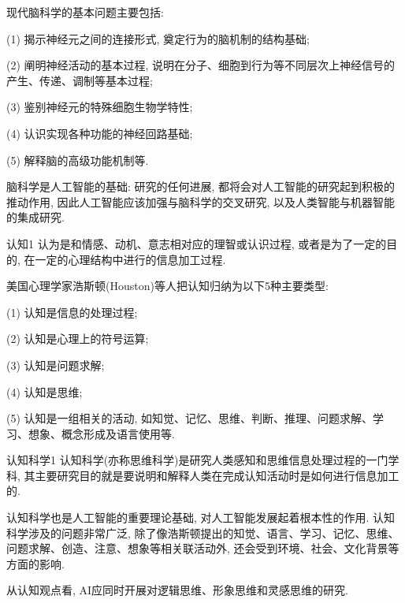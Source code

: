 现代脑科学的基本问题主要包括:

  (1) 揭示神经元之间的连接形式, 奠定行为的脑机制的结构基础;

  (2) 阐明神经活动的基本过程, 说明在分子、细胞到行为等不同层次上神经信号的产生、传递、调制等基本过程;

  (3) 鉴别神经元的特殊细胞生物学特性;

  (4) 认识实现各种功能的神经回路基础;

  (5) 解释脑的高级功能机制等.

脑科学是人工智能的基础: 研究的任何进展, 都将会对人工智能的研究起到积极的推动作用, 因此人工智能应该加强与脑科学的交叉研究, 以及人类智能与机器智能的集成研究.
\begin{mydef}{认知}{1}
认为是和情感、动机、意志相对应的理智或认识过程, 或者是为了一定的目的, 在一定的心理结构中进行的信息加工过程.
\end{mydef}

美国心理学家浩斯顿(Houston)等人把认知归纳为以下5种主要类型:

(1) 认知是信息的处理过程;

(2) 认知是心理上的符号运算;

(3) 认知是问题求解;

(4) 认知是思维;

(5) 认知是一组相关的活动, 如知觉、记忆、思维、判断、推理、问题求解、学习、想象、概念形成及语言使用等.

\begin{mydef}{认知科学}{1}
认知科学(亦称思维科学)是研究人类感知和思维信息处理过程的一门学科, 其主要研究目的就是要说明和解释人类在完成认知活动时是如何进行信息加工的.
\end{mydef}

认知科学也是人工智能的重要理论基础, 对人工智能发展起着根本性的作用. 认知科学涉及的问题非常广泛, 除了像浩斯顿提出的知觉、语言、学习、记忆、思维、问题求解、创造、注意、想象等相关联活动外, 还会受到环境、社会、文化背景等方面的影响.

从认知观点看, AI应同时开展对逻辑思维、形象思维和灵感思维的研究.


